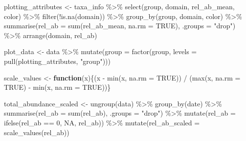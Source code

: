 \documentclass[
  letterpaper,
  DIV=11,
  numbers=noendperiod]{scrreprt}
\newenvironment{Shaded}{\begin{snugshade}}{\end{snugshade}}
\newcommand{\AttributeTok}[1]{\textcolor[rgb]{0.40,0.45,0.13}{#1}}
\newcommand{\ConstantTok}[1]{\textcolor[rgb]{0.56,0.35,0.01}{#1}}
\newcommand{\ControlFlowTok}[1]{\textcolor[rgb]{0.00,0.23,0.31}{\textbf{#1}}}
\newcommand{\DecValTok}[1]{\textcolor[rgb]{0.68,0.00,0.00}{#1}}
\newcommand{\FunctionTok}[1]{\textcolor[rgb]{0.28,0.35,0.67}{#1}}
\newcommand{\NormalTok}[1]{\textcolor[rgb]{0.00,0.23,0.31}{#1}}
\newcommand{\OtherTok}[1]{\textcolor[rgb]{0.00,0.23,0.31}{#1}}
\newcommand{\SpecialCharTok}[1]{\textcolor[rgb]{0.37,0.37,0.37}{#1}}
\newcommand{\StringTok}[1]{\textcolor[rgb]{0.13,0.47,0.30}{#1}}
\begin{document}
\begin{Shaded}
\begin{Highlighting}[]
\NormalTok{plotting\_attributes }\OtherTok{\textless{}{-}}\NormalTok{ taxa\_info }\SpecialCharTok{\%\textgreater{}\%}
  \FunctionTok{select}\NormalTok{(group, domain, rel\_ab\_mean, color) }\SpecialCharTok{\%\textgreater{}\%}
  \FunctionTok{filter}\NormalTok{(}\SpecialCharTok{!}\FunctionTok{is.na}\NormalTok{(domain)) }\SpecialCharTok{\%\textgreater{}\%} 
  \FunctionTok{group\_by}\NormalTok{(group, domain, color) }\SpecialCharTok{\%\textgreater{}\%}
  \FunctionTok{summarise}\NormalTok{(}\AttributeTok{rel\_ab =} \FunctionTok{sum}\NormalTok{(rel\_ab\_mean, }\AttributeTok{na.rm =} \ConstantTok{TRUE}\NormalTok{), }\AttributeTok{.groups =} \StringTok{"drop"}\NormalTok{) }\SpecialCharTok{\%\textgreater{}\%}
  \FunctionTok{arrange}\NormalTok{(domain, rel\_ab)}

\NormalTok{plot\_data }\OtherTok{\textless{}{-}}\NormalTok{ data }\SpecialCharTok{\%\textgreater{}\%}
  \FunctionTok{mutate}\NormalTok{(}\AttributeTok{group =} \FunctionTok{factor}\NormalTok{(group, }\AttributeTok{levels =} \FunctionTok{pull}\NormalTok{(plotting\_attributes, }\StringTok{"group"}\NormalTok{)))}

\NormalTok{scale\_values }\OtherTok{\textless{}{-}} \ControlFlowTok{function}\NormalTok{(x)\{(x }\SpecialCharTok{{-}} \FunctionTok{min}\NormalTok{(x, }\AttributeTok{na.rm =} \ConstantTok{TRUE}\NormalTok{)) }\SpecialCharTok{/}\NormalTok{ (}\FunctionTok{max}\NormalTok{(x, }\AttributeTok{na.rm =} \ConstantTok{TRUE}\NormalTok{) }\SpecialCharTok{{-}} \FunctionTok{min}\NormalTok{(x, }\AttributeTok{na.rm =} \ConstantTok{TRUE}\NormalTok{))\} }

\NormalTok{total\_abundance\_scaled }\OtherTok{\textless{}{-}} \FunctionTok{ungroup}\NormalTok{(data) }\SpecialCharTok{\%\textgreater{}\%}
  \FunctionTok{group\_by}\NormalTok{(date) }\SpecialCharTok{\%\textgreater{}\%}
  \FunctionTok{summarise}\NormalTok{(}\AttributeTok{rel\_ab =} \FunctionTok{sum}\NormalTok{(rel\_ab), }\AttributeTok{.groups =} \StringTok{"drop"}\NormalTok{) }\SpecialCharTok{\%\textgreater{}\%} 
  \FunctionTok{mutate}\NormalTok{(}\AttributeTok{rel\_ab =} \FunctionTok{ifelse}\NormalTok{(rel\_ab }\SpecialCharTok{==} \DecValTok{0}\NormalTok{, }\ConstantTok{NA}\NormalTok{, rel\_ab)) }\SpecialCharTok{\%\textgreater{}\%} 
  \FunctionTok{mutate}\NormalTok{(}\AttributeTok{rel\_ab\_scaled =} \FunctionTok{scale\_values}\NormalTok{(rel\_ab))}
\end{Highlighting}
\end{Shaded}
\end{document}
